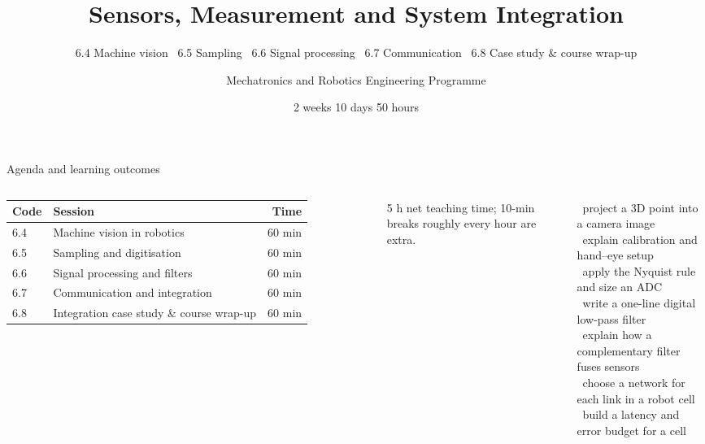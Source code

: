 \documentclass[aspectratio=169,10pt]{beamer}
\title[W2D5: Vision, Signals \& Integration]{Sensors, Measurement and System Integration}
\subtitle{6.4 Machine vision \textbullet\ 6.5 Sampling \textbullet\ 6.6 Signal processing \textbullet\ 6.7 Communication \textbullet\ 6.8 Case study \& course wrap-up}
\author{Mechatronics and Robotics Engineering Programme}
\institute{Week 2 \textperiodcentered{} Day 5}
\date{2 weeks \textperiodcentered{} 10 days \textperiodcentered{} 50 hours}
\begin{document}
\begin{frame}[plain]\titlepage\end{frame}

\begin{frame}{Agenda and learning outcomes}
\begin{columns}[T]
\small
\renewcommand{\arraystretch}{1.12}
\begin{tabularx}{\linewidth}{@{}l X r@{}}
\toprule
\textbf{Code} & \textbf{Session} & \textbf{Time}\\
\midrule
6.4 & Machine vision in robotics & 60 min\\
6.5 & Sampling and digitisation & 60 min\\
6.6 & Signal processing and filters & 60 min\\
6.7 & Communication and integration & 60 min\\
6.8 & Integration case study \& course wrap-up & 60 min\\
\bottomrule
\end{tabularx}

\vspace{2mm}
{\footnotesize\color{mkGray} 5 h net teaching time; 10-min breaks roughly every hour are extra.}
\begin{keybox}
\small
\checkitem\ project a 3D point into a camera image\\
\checkitem\ explain calibration and hand--eye setup\\
\checkitem\ apply the Nyquist rule and size an ADC\\
\checkitem\ write a one-line digital low-pass filter\\
\checkitem\ explain how a complementary filter fuses sensors\\
\checkitem\ choose a network for each link in a robot cell\\
\checkitem\ build a latency and error budget for a cell
\end{keybox}
\end{columns}
\end{frame}
\end{document}
